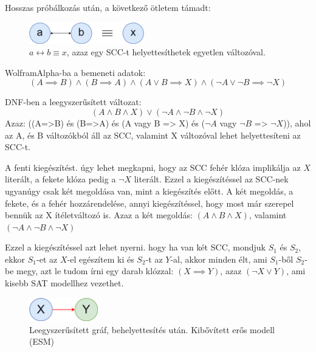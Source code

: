 \documentclass[
]{thesis-ekf}
\theoremstyle{definition}
\theoremstyle{remark}
\begin{document}
	Hosszas próbálkozás után, a következő ötletem támadt:
	
	\begin{figure}[h]
		\centering
		\includegraphics[width=5cm]{images/sajat_pelda}
		\caption{$ a\leftrightarrow b\equiv x$, azaz egy \textsc{SCC}-t helyettesíthetek egyetlen változóval.}
		\label{abra-sajatpelda-ab-x}
	\end{figure}
	
	
	WolframAlpha-ba a bemeneti adatok:
	\[ (A\implies B)\wedge(B\implies A)\wedge(A\vee B \implies X)\wedge(\neg A\vee\neg B\implies\neg X) \]

	\textsc{DNF}-ben a leegyszerűsített változat:
	\[ (A\wedge B\wedge X)\vee(\neg A\wedge\neg B\wedge\neg X) \]	
	Azaz: ((A=>B) és (B=>A) és (A vagy B => X) és ($ \neg A $ vagy $ \neg B $ => $ \neg X $)), ahol az A, és B változókból áll az \textsc{SCC}, valamint X változóval lehet helyettesíteni az \textsc{SCC}-t.
	
	A fenti kiegészítést. úgy lehet megkapni, hogy az \textsc{SCC} fehér klóza implikálja az $ X $ literált, a fekete klóza pedig a $ \neg X $ literált. Ezzel a kiegészítéssel az \textsc{SCC}-nek ugyanúgy csak két megoldása van, mint a kiegészítés előtt. A két megoldás, a fekete, és a fehér hozzárendelése, annyi kiegészítéssel, hogy most már szerepel bennük az X ítéletváltozó is. Azaz a két megoldás: $ (A \wedge B \wedge X) $, valamint $ (\neg A \wedge \neg B \wedge \neg X) $
	
	Ezzel a kiegészítéssel azt lehet nyerni. hogy ha van két \textsc{SCC}, mondjuk $ S_1 $ és $ S_2 $, ekkor $ S_1 $-et az $ X $-el egészítem ki és $ S_2 $-t az $ Y $-al, akkor minden élt, ami $ S_1 $-ből $ S_2 $-be megy, azt le tudom írni egy darab klózzal: $ (X\implies Y) $, azaz $ (\neg X\vee Y) $, ami kisebb \textsc{SAT} modellhez vezethet.
	
	\begin{figure}[h]
		\centering
		\includegraphics[width=3cm]{images/sajat_pelda_5_9_to_esm}
		\caption{Leegyszerűsített gráf, behelyettesítés után. Kibővített erős modell (\textsc{ESM})}
		\label{abra-sajatpelda-59to-esm}
	\end{figure}
\end{document}
